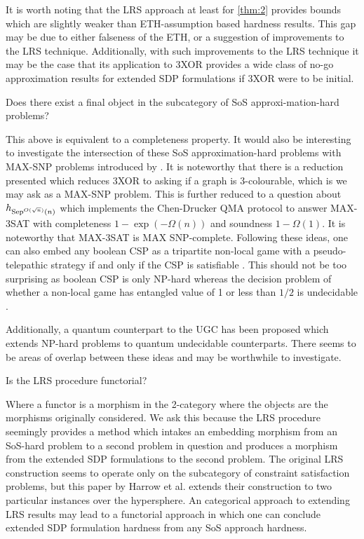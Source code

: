 \documentclass[runningheads,a4paper,english]{llncs}[2022/01/12]
\begin{document}
It is worth noting that the LRS approach at least for \cref{thm:2} provides bounds which are slightly weaker than ETH-assumption based hardness results.
This gap may be due to either falseness of the ETH, or a suggestion of improvements to the LRS technique.
Additionally, with such improvements to the LRS technique it may be the case that its application to \textsc{3XOR} provides a wide class of no-go approximation results for extended SDP formulations if \textsc{3XOR} were to be initial.

\begin{conjecture}
Does there exist a final object in the subcategory of SoS approxi-mation-hard problems?
\end{conjecture}
This above is equivalent to a completeness property.
It would also be interesting to investigate the intersection of these SoS approximation-hard problems with MAX-SNP problems introduced by \cite{PAPADIMITRIOU1991425}.
It is noteworthy that there is a reduction presented which reduces \textsc{3XOR} to asking if a graph is 3-colourable, which is we may ask as a MAX-SNP problem.
This is further reduced to a question about $h_{\operatorname{Sep}^{O(\sqrt{n})}(n)}$ which implements the Chen-Drucker \cite{chen2010shortmultiproverquantumproofs} QMA protocol to answer MAX-3SAT with completeness $1-\exp(-\Omega(n))$ and soundness $1-\Omega(1)$.
It is noteworthy that MAX-3SAT is MAX SNP-complete.
Following these ideas, one can also embed any boolean CSP as a tripartite non-local game with a pseudo-telepathic strategy if and only if the CSP is satisfiable \cite{preda2011non}.
This should not be too surprising as boolean CSP is only NP-hard whereas the decision problem of whether a non-local game has entangled value of 1 or less than $1/2$ is undecidable \cite{ji2021mip}.

Additionally, a quantum counterpart to the UGC has been proposed \cite{mousavi2024quantumuniquegamesconjecture} which extends NP-hard problems to quantum undecidable counterparts.
There seems to be areas of overlap between these ideas and may be worthwhile to investigate.

\begin{conjecture}
Is the LRS procedure functorial?
\end{conjecture}
Where a functor is a morphism in the 2-category where the objects are the morphisms originally considered.
We ask this because the LRS procedure seemingly provides a method which intakes an embedding morphism from an SoS-hard problem to a second problem in question and produces a morphism from the extended SDP formulations to the second problem.
The original LRS construction seems to operate only on the subcategory of constraint satisfaction problems, but this paper by Harrow et al. extends their construction to two particular instances over the hypersphere.
An categorical approach to extending LRS results may lead to a functorial approach in which one can conclude extended SDP formulation hardness from any SoS approach hardness.
\end{document}
